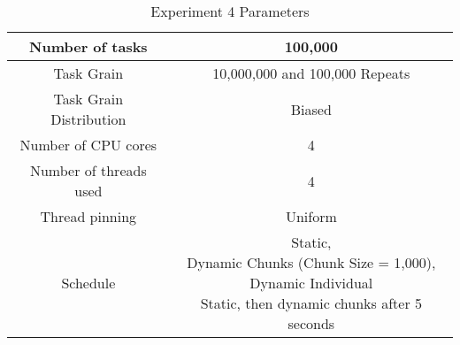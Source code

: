 \begin{table}
\centering
 \begin{tabular}{|c|c|}
  \hline
  Number of tasks & 100,000 \\
  \hline
  Task Grain & 10,000,000 and 100,000 Repeats \\
  \hline
  Task Grain Distribution & Biased \\
  \hline
  Number of CPU cores & 4 \\
  \hline
  Number of threads used & 4 \\
  \hline
  Thread pinning & Uniform \\
  \hline
  Schedule & \specialcell{Static, \\ Dynamic Chunks (Chunk Size = 1,000), \\ Dynamic Individual \\ Static, then dynamic chunks after 5 seconds} \\
  \hline
 \end{tabular}
\caption{Experiment 4 Parameters}
\iflabeld
\label{table:evaluation_ex4_parameters}
\fi
{}
\end{table}
